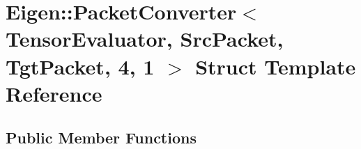 \hypertarget{struct_eigen_1_1_packet_converter_3_01_tensor_evaluator_00_01_src_packet_00_01_tgt_packet_00_014_00_011_01_4}{}\section{Eigen\+:\+:Packet\+Converter$<$ Tensor\+Evaluator, Src\+Packet, Tgt\+Packet, 4, 1 $>$ Struct Template Reference}
\label{struct_eigen_1_1_packet_converter_3_01_tensor_evaluator_00_01_src_packet_00_01_tgt_packet_00_014_00_011_01_4}
\subsection*{Public Member Functions}
